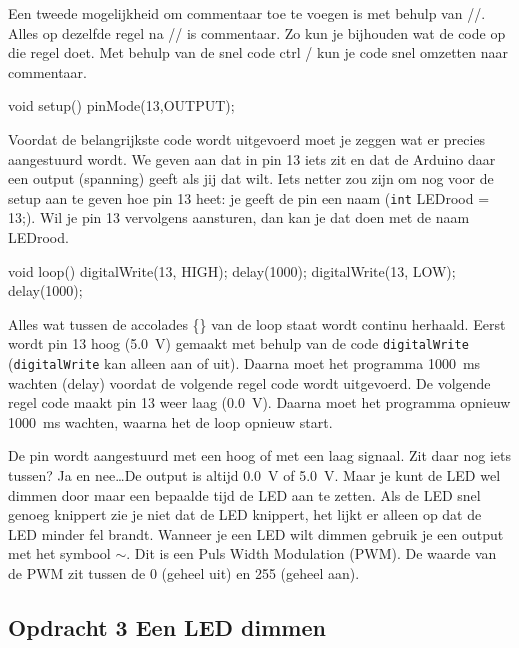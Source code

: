 \documentclass{arduino}
\begin{document}
\smallskip

Een tweede mogelijkheid om commentaar toe te voegen is met behulp van //. Alles op dezelfde regel na // is commentaar. Zo kun je bijhouden wat de code op die regel doet. Met behulp van de snel code ctrl / kun je code snel omzetten naar commentaar.
\begin{marginlisting}
void setup(){
  pinMode(13,OUTPUT);
}
\end{marginlisting}


Voordat de belangrijkste code wordt uitgevoerd moet je zeggen wat er precies aangestuurd wordt. We geven aan dat in pin 13 iets zit en dat de Arduino daar een output (spanning) geeft als jij dat wilt. Iets netter zou zijn om nog voor de setup aan te geven hoe pin 13 heet: je geeft de pin een naam (\lstinline{int} LEDrood = 13;). Wil je pin 13 vervolgens aansturen, dan kan je dat doen met de naam LEDrood.
\begin{marginlisting}
void loop() {
  digitalWrite(13, HIGH);
  delay(1000);
  digitalWrite(13, LOW);
  delay(1000);
}
\end{marginlisting}

Alles wat tussen de accolades \{\} van de loop staat wordt continu herhaald. Eerst wordt pin 13 hoog (\SI{5.0}{\volt}) gemaakt met behulp van de code \lstinline{digitalWrite} (\lstinline{digitalWrite} kan alleen aan of uit). Daarna moet het programma \SI{1000}{\milli\s} wachten (delay) voordat de volgende regel code wordt uitgevoerd. De volgende regel code maakt pin 13 weer laag (\SI{0.0}{\volt}). Daarna moet het programma opnieuw \SI{1000}{\milli\s} wachten, waarna het de loop opnieuw start.


De pin wordt aangestuurd met een hoog of met een laag signaal. Zit daar nog iets tussen? Ja en nee\dots De output is altijd \SI{0.0}{\volt} of \SI{5.0}{\volt}. Maar je kunt de LED wel dimmen door maar een bepaalde tijd de LED aan te zetten. Als de LED snel genoeg knippert zie je niet dat de LED knippert, het lijkt er alleen op dat de LED minder fel brandt. Wanneer je een LED wilt dimmen gebruik je een output met het symbool $\sim$. Dit is een Puls Width Modulation (PWM). De waarde van de PWM zit tussen de 0 (geheel uit) en 255 (geheel aan).

\newpage

\subsection{Opdracht 3 Een LED dimmen}
\end{document}
